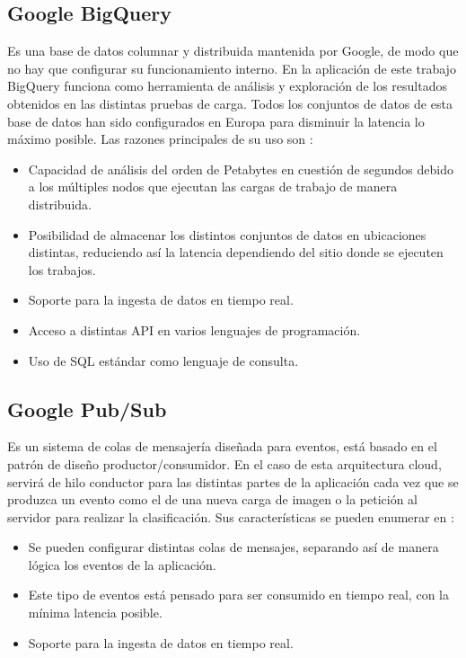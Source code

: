\subsection{Google BigQuery}\label{subsec:bigquery}
Es una base de datos columnar y distribuida mantenida por Google, de modo que no hay que configurar su funcionamiento interno.
En la aplicación de este trabajo BigQuery funciona como herramienta de análisis y exploración de los resultados obtenidos en las distintas pruebas de carga.
Todos los conjuntos de datos de esta base de datos han sido configurados en Europa para disminuir la latencia lo máximo posible.
Las razones principales de su uso son :
\begin{itemize}
    \item Capacidad de análisis del orden de Petabytes en cuestión de segundos debido a los múltiples nodos que ejecutan las cargas de trabajo de manera distribuida.
    \item Posibilidad de almacenar los distintos conjuntos de datos en ubicaciones distintas, reduciendo así la latencia dependiendo del sitio donde se ejecuten los trabajos.
    \item Soporte para la ingesta de datos en tiempo real.
    \item Acceso a distintas API en varios lenguajes de programación.
    \item Uso de SQL estándar como lenguaje de consulta.
\end{itemize}

\subsection{Google Pub/Sub}\label{subsec:pubsub}
Es un sistema de colas de mensajería diseñada para eventos,
está basado en el patrón de diseño productor/consumidor.
En el caso de esta arquitectura cloud, servirá de hilo conductor para las distintas partes de la aplicación cada vez que se produzca un evento como el de una nueva carga de imagen o la petición al servidor para realizar la clasificación.
Sus características se pueden enumerar en :

\begin{itemize}
    \item Se pueden configurar distintas colas de mensajes, separando así de manera lógica los eventos de la aplicación.
    \item Este tipo de eventos está pensado para ser consumido en tiempo real, con la mínima latencia posible.
    \item Soporte para la ingesta de datos en tiempo real.
\end{itemize}

